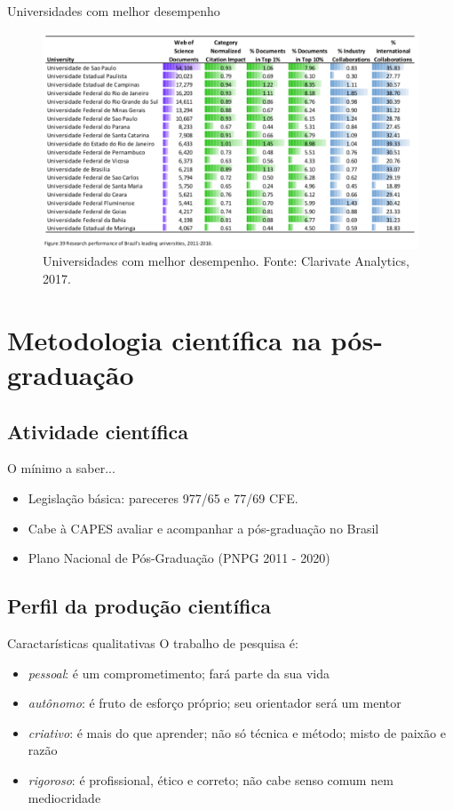 \begin{frame}{Universidades com melhor desempenho}
\begin{figure}
\centering
\includegraphics[scale=0.27]{figs/01/panorama-univs}
\caption{Universidades com melhor desempenho. Fonte: Clarivate Analytics, 2017.}
\end{figure}
\end{frame}

\section{Metodologia científica na pós-graduação} 

\subsection*{Atividade científica}

\begin{frame}{O mínimo a saber...}
\begin{itemize}
\item Legislação básica: pareceres 977/65 e 77/69 CFE.
\item Cabe à CAPES avaliar e acompanhar a pós-graduação no Brasil 
\item Plano Nacional de Pós-Graduação (PNPG 2011 - 2020)
\end{itemize}
\end{frame}

\subsection*{Perfil da produção científica}

\begin{frame}{Caractarísticas qualitativas}
O trabalho de pesquisa é: 

\begin{itemize}
\item \textit{pessoal}: é um comprometimento; fará parte da sua vida
\item \textit{autônomo}: é fruto de esforço próprio; seu orientador será um mentor 
\item \textit{criativo}: é mais do que aprender; não só técnica e método; misto de paixão e razão
\item \textit{rigoroso}: é profissional, ético e correto; não cabe senso comum nem mediocridade
\end{itemize}
\end{frame}

